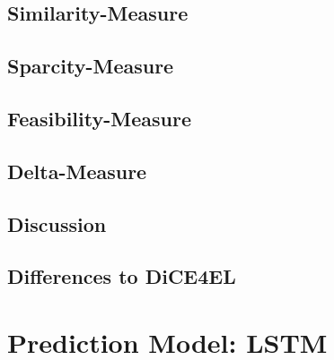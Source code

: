\documentclass[12pt,a4paper]{report}
\begin{document}
\subsection{Similarity-Measure}
\label{sec:similarity}


\subsection{Sparcity-Measure}
\label{sec:sparcity}


\subsection{Feasibility-Measure}
\label{sec:feasibility}




\subsection{Delta-Measure}
\label{sec:delta}


\subsection{Discussion}


\subsection{Differences to DiCE4EL}

 


\section{Prediction Model: LSTM}
\label{sec:model_prediction}



% 
\end{document}
